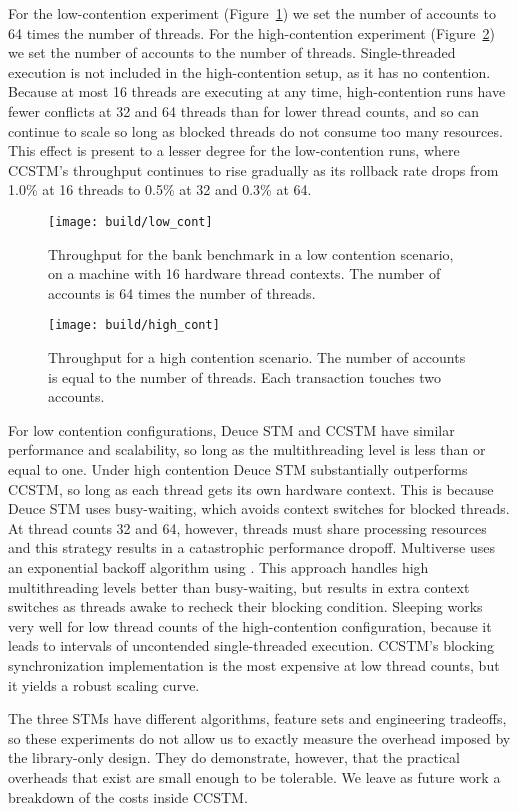 For the low-contention
experiment (Figure~\ref{fig:lowcont}) we set the number of accounts
to 64 times the number of threads.  For the high-contention experiment
(Figure~\ref{fig:highcont}) we set the number of accounts to the number of
threads.  Single-threaded execution is not included in the high-contention
setup, as it has no contention.  Because at most 16 threads are executing
at any time, high-contention runs have fewer conflicts at 32 and 64
threads than for lower thread counts, and so can continue to scale so long as
blocked threads do not consume too many resources.  This effect is present
to a lesser degree for the low-contention runs, where CCSTM's throughput
continues to rise gradually as its rollback rate
drops from 1.0\% at 16 threads to 0.5\% at 32 and 0.3\% at 64.

\begin{figure}
  \centering \texttt{[image: build/low\_cont]}

\caption{Throughput for the bank benchmark in a low contention scenario,
on a machine with 16 hardware thread contexts.  The number of accounts
is 64 times the number of threads.}

  \label{fig:lowcont}
\end{figure}

\begin{figure}
  \centering \texttt{[image: build/high\_cont]}

\caption{Throughput for a high contention scenario.  The number of accounts is
equal to the number of threads.  Each transaction touches two accounts.}

  \label{fig:highcont}
\end{figure}

For low contention configurations, Deuce STM and CCSTM have similar
performance and scalability, so long as the multithreading level is less
than or equal to one.  Under high contention Deuce STM substantially
outperforms CCSTM, so long as each thread gets its own hardware context.
This is because Deuce STM uses busy-waiting, which avoids context switches
for blocked threads.  At thread counts 32 and 64, however, threads must
share processing resources and this strategy results in a catastrophic
performance dropoff.  Multiverse uses an exponential backoff algorithm
using .  This approach handles high multithreading
levels better than busy-waiting, but results in extra context switches as
threads awake to recheck their blocking condition.  Sleeping works very well
for low thread counts
of the high-contention configuration, because
it leads to intervals of uncontended single-threaded execution.
CCSTM's blocking synchronization implementation is the most
expensive at low thread counts, but it yields a robust scaling curve.

The three STMs have different algorithms, feature sets and engineering
tradeoffs, so these experiments do not allow us to exactly measure
the overhead imposed by the library-only design.  They do demonstrate,
however, that the practical overheads that exist are small enough to be
tolerable.  We leave as future work a breakdown of the costs inside CCSTM.

